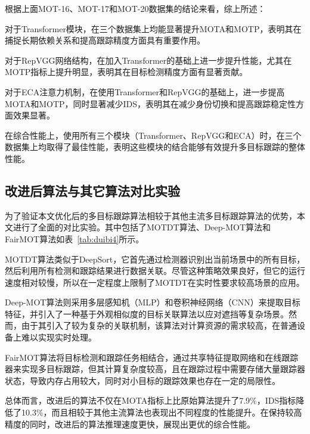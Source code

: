 根据上面MOT-16、MOT-17和MOT-20数据集的结论来看，综上所述：

对于Transformer模块，在三个数据集上均能显著提升MOTA和MOTP，表明其在捕捉长期依赖关系和提高跟踪精度方面具有重要作用。

对于RepVGG网络结构，在加入Transformer的基础上进一步提升性能，尤其在MOTP指标上提升明显，表明其在目标检测精度方面有显著贡献。

对于ECA注意力机制，在使用Transformer和RepVGG的基础上，进一步提高MOTA和MOTP，同时显著减少IDS，表明其在减少身份切换和提高跟踪稳定性方面效果显著。

在综合性能上，使用所有三个模块（Transformer、RepVGG和ECA）时，在三个数据集上均取得了最佳性能，表明这些模块的结合能够有效提升多目标跟踪的整体性能。


\subsection{改进后算法与其它算法对比实验}
为了验证本文优化后的多目标跟踪算法相较于其他主流多目标跟踪算法的优势，本文进行了全面的对比实验。其中包括了MOTDT算法、Deep-MOT算法和FairMOT算法如表~\ref{tab:duibi4}所示。

MOTDT\cite{chen2022memot}算法类似于DeepSort，它首先通过检测器识别出当前场景中的所有目标，然后利用所有检测和跟踪结果进行数据关联。尽管这种策略效果良好，但它的运行速度相对较慢，所以在一定程度上限制了MOTDT在实时性要求较高场景的应用。

Deep-MOT\cite{xu2020train}算法则采用多层感知机（MLP）和卷积神经网络（CNN）来提取目标特征，并引入了一种基于外观相似度的目标关联算法以应对遮挡等复杂场景。然而，由于其引入了较为复杂的关联机制，该算法对计算资源的需求较高，在普通设备上难以实现实时处理。

FairMOT\cite{fairmot-springer}算法将目标检测和跟踪任务相结合，通过共享特征提取网络和在线跟踪器来实现多目标跟踪，但其计算复杂度较高，且在跟踪过程中需要存储大量跟踪器状态，导致内存占用较大，同时对小目标的跟踪效果也存在一定的局限性。

总体而言，改进后的算法不仅在MOTA指标上比原始算法提升了7.9\%，IDS指标降低了10.3\%，而且相较于其他主流算法也表现出不同程度的性能提升。在保持较高精度的同时，改进后的算法推理速度更快，展现出更优的综合性能。

\begin{table}[htbp]
	\centering
	\caption{多目标跟踪算法性能对比}
	\label{tab:duibi4}
\end{table}

